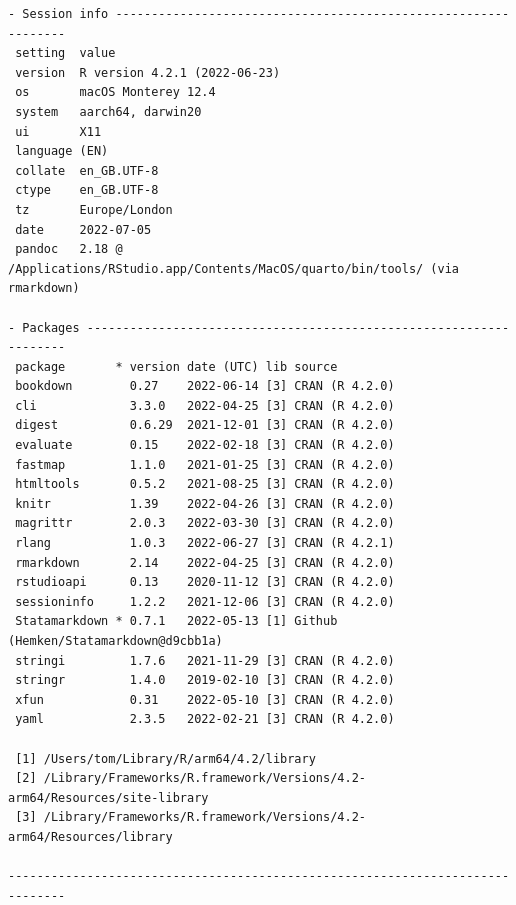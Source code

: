 \documentclass[
  10pt,
]{book}
\begin{document}
\begin{verbatim}
- Session info ---------------------------------------------------------------
 setting  value
 version  R version 4.2.1 (2022-06-23)
 os       macOS Monterey 12.4
 system   aarch64, darwin20
 ui       X11
 language (EN)
 collate  en_GB.UTF-8
 ctype    en_GB.UTF-8
 tz       Europe/London
 date     2022-07-05
 pandoc   2.18 @ /Applications/RStudio.app/Contents/MacOS/quarto/bin/tools/ (via rmarkdown)

- Packages -------------------------------------------------------------------
 package       * version date (UTC) lib source
 bookdown        0.27    2022-06-14 [3] CRAN (R 4.2.0)
 cli             3.3.0   2022-04-25 [3] CRAN (R 4.2.0)
 digest          0.6.29  2021-12-01 [3] CRAN (R 4.2.0)
 evaluate        0.15    2022-02-18 [3] CRAN (R 4.2.0)
 fastmap         1.1.0   2021-01-25 [3] CRAN (R 4.2.0)
 htmltools       0.5.2   2021-08-25 [3] CRAN (R 4.2.0)
 knitr           1.39    2022-04-26 [3] CRAN (R 4.2.0)
 magrittr        2.0.3   2022-03-30 [3] CRAN (R 4.2.0)
 rlang           1.0.3   2022-06-27 [3] CRAN (R 4.2.1)
 rmarkdown       2.14    2022-04-25 [3] CRAN (R 4.2.0)
 rstudioapi      0.13    2020-11-12 [3] CRAN (R 4.2.0)
 sessioninfo     1.2.2   2021-12-06 [3] CRAN (R 4.2.0)
 Statamarkdown * 0.7.1   2022-05-13 [1] Github (Hemken/Statamarkdown@d9cbb1a)
 stringi         1.7.6   2021-11-29 [3] CRAN (R 4.2.0)
 stringr         1.4.0   2019-02-10 [3] CRAN (R 4.2.0)
 xfun            0.31    2022-05-10 [3] CRAN (R 4.2.0)
 yaml            2.3.5   2022-02-21 [3] CRAN (R 4.2.0)

 [1] /Users/tom/Library/R/arm64/4.2/library
 [2] /Library/Frameworks/R.framework/Versions/4.2-arm64/Resources/site-library
 [3] /Library/Frameworks/R.framework/Versions/4.2-arm64/Resources/library

------------------------------------------------------------------------------
\end{verbatim}

  

\backmatter
\end{document}
